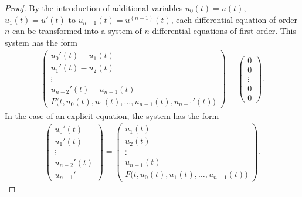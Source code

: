 \begin{proof}
  By the introduction of additional variables $u_0(t) = u(t)$, $u_1(t)
  = u'(t)$ to $u_{n-1}(t) = u^{(n-1)}(t)$, each differential equation of
  order $n$ can be transformed into a system of $n$ differential equations
  of first order. This system has the form
  \begin{gather}
    \label{eq:awa:13}
    \begin{pmatrix}
      u_0'(t) - u_1(t) \\
      u_1'(t) - u_2(t) \\
      \vdots\\
      u_{n-2}'(t) - u_{n-1}(t) \\
      F\bigl(t, u_0(t),u_1(t),\dots,u_{n-1}(t), u_{n-1}'(t)\bigr)
    \end{pmatrix}
    =
    \begin{pmatrix}
      0\\0\\\vdots\\0\\0
    \end{pmatrix}.
  \end{gather}
  In the case of an explicit equation, the system has the form
  \begin{gather}
    \label{eq:awa:13a}
    \begin{pmatrix}
      u_0'(t) \\
      u_1'(t) \\
      \vdots\\
      u_{n-2}'(t) \\
      u_{n-1}'
    \end{pmatrix}
    =
    \begin{pmatrix}
      u_1(t)\\u_2(t)\\\vdots\\u_{n-1}(t)\\F\bigl(t, u_0(t),u_1(t),\dots,u_{n-1}(t)\bigr)
    \end{pmatrix}.
  \end{gather}
\end{proof}

